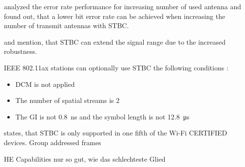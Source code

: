 \textcite{ghosh_error_2014} analyzed the error rate performance for increasing number of used antenna and found out, that a lower bit error rate can be achieved
when increasing the number of transmit antennas with \ac{STBC}.

\textcite{gast_80211n_nodate} and \textcite{sauter_wireless_2022} mention, that \ac{STBC} can extend the signal range due to the increased robustness.

IEEE 802.11ax stations can optionally use \ac{STBC} the following conditions \cite{noauthor_ieee_2021}:
\begin{itemize}
	\item DCM is not applied
	\item The number of spatial streams is \num{2}
	\item The \ac{GI} is not \SI{0.8}{\nano\second} and the symbol length is not \SI{12.8}{\micro\second}
\end{itemize}




\cite{gast_80211n_nodate} states, that \ac{STBC} is only supported in one fifth of the Wi-Fi CERTIFIED devices.
Group addressed frames


HE Capabilities nur so gut, wie das schlechteste Glied